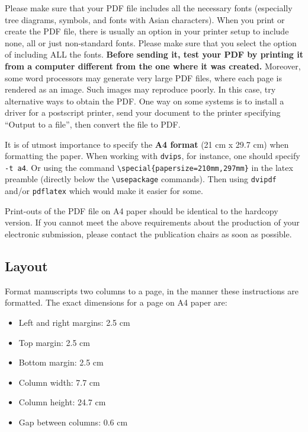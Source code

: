 \documentclass[11pt]{article}
\begin{document}
Please make sure that your PDF file includes all the necessary fonts
(especially tree diagrams, symbols, and fonts with Asian
characters). When you print or create the PDF file, there is usually
an option in your printer setup to include none, all or just
non-standard fonts.  Please make sure that you select the option of
including ALL the fonts. \textbf{Before sending it, test your PDF by
  printing it from a computer different from the one where it was
  created.} Moreover, some word processors may generate very large PDF
files, where each page is rendered as an image. Such images may
reproduce poorly. In this case, try alternative ways to obtain the
PDF. One way on some systems is to install a driver for a postscript
printer, send your document to the printer specifying ``Output to a
file'', then convert the file to PDF.

It is of utmost importance to specify the \textbf{A4 format} (21 cm
x 29.7 cm) when formatting the paper. When working with
  {\tt dvips}, for instance, one should specify {\tt -t a4}.
Or using the command \verb|\special{papersize=210mm,297mm}| in the latex
preamble (directly below the \verb|\usepackage| commands). Then using
  {\tt dvipdf} and/or {\tt pdflatex} which would make it easier for some.


Print-outs of the PDF file on A4 paper should be identical to the
hardcopy version. If you cannot meet the above requirements about the
production of your electronic submission, please contact the
publication chairs as soon as possible.


\subsection{Layout}
\label{ssec:layout}

Format manuscripts two columns to a page, in the manner these
instructions are formatted. The exact dimensions for a page on A4
paper are:

\begin{itemize}
  \item Left and right margins: 2.5 cm
  \item Top margin: 2.5 cm
  \item Bottom margin: 2.5 cm
  \item Column width: 7.7 cm
  \item Column height: 24.7 cm
  \item Gap between columns: 0.6 cm
\end{itemize}
\end{document}
